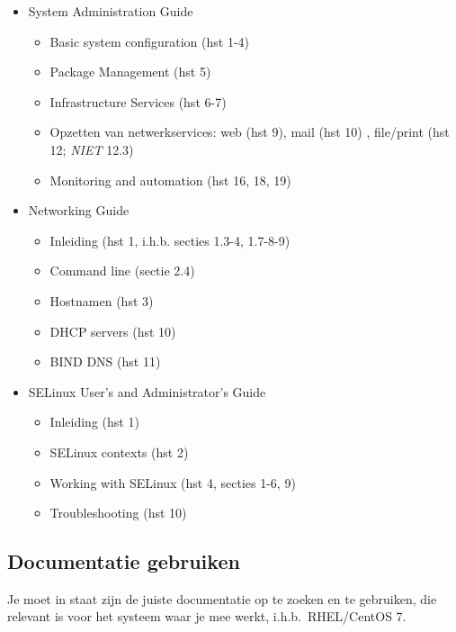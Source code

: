 \begin{itemize}
  \item System Administration Guide~\autocite{SvistunovEtAl2016}
  
  \begin{itemize}
    \item Basic system configuration (hst 1-4)
    \item Package Management (hst 5)
    \item Infrastructure Services (hst 6-7)
    \item Opzetten van netwerkservices: web (hst 9), mail (hst 10) , file/print (hst 12; \emph{NIET} 12.3)
    \item Monitoring and automation (hst 16, 18, 19)
  \end{itemize}
  
  \item Networking Guide~\autocite{JahodaEtAl2016}
  
  \begin{itemize}
    \item Inleiding (hst 1, i.h.b. secties 1.3-4, 1.7-8-9)
    \item Command line (sectie 2.4)
    \item Hostnamen (hst 3)
    \item DHCP servers (hst 10)
    \item BIND DNS (hst 11)
  \end{itemize}
  \item
  SELinux User's and Administrator's Guide~\autocite{JahodaEtAl2016a}
  
  \begin{itemize}
    \item Inleiding (hst 1)
    \item SELinux contexts (hst 2)
    \item Working with SELinux (hst 4, secties 1-6, 9)
    \item Troubleshooting (hst 10)
  \end{itemize}
\end{itemize}

\subsection{Documentatie gebruiken}
\label{ssec:documentatie-gebruiken}

Je moet in staat zijn de juiste documentatie op te zoeken en te gebruiken, die relevant is voor het systeem waar je mee werkt, i.h.b.~RHEL/CentOS 7.

